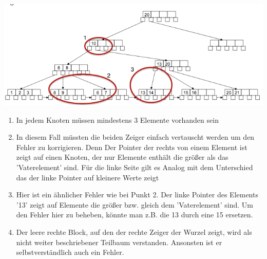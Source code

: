 \documentclass[12pt]{article}
\begin{document}
\includegraphics[width=\textwidth]{B+Baum_falsch.png}

\begin{enumerate}
    \item In jedem Knoten müssen mindestens 3 Elemente vorhanden sein

    \item In diesem Fall müssten die beiden Zeiger einfach vertauscht werden um
        den Fehler zu korrigieren. Denn Der Pointer der rechts von einem Element
        ist zeigt auf einen Knoten, der nur Elemente enthält die größer als das
        'Vaterelement' sind. Für die linke Seite gilt es Analog mit dem
        Unterschied das der linke Pointer auf kleinere Werte zeigt

    \item Hier ist ein ähnlicher Fehler wie bei Punkt 2. Der linke Pointer des
        Elements '13' zeigt auf Elemente die größer bzw. gleich dem
        'Vaterelement' sind. Um den Fehler hier zu beheben, könnte man z.B. die
        13 durch eine 15 ersetzen.

    \item Der leere rechte Block, auf den der rechte Zeiger der Wurzel zeigt,
        wird als nicht weiter beschriebener Teilbaum verstanden. Ansonsten ist
        er selbstverständlich auch ein Fehler.
 
\end{enumerate}
\end{document}
